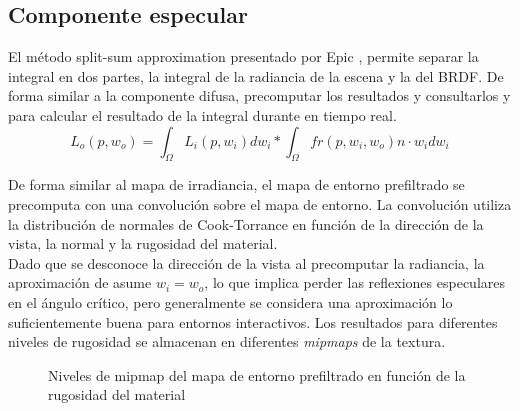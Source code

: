 
        \subsection{Componente especular}
        El m\'etodo split-sum approximation presentado por Epic \autocite{unreal}, permite separar la integral en dos partes, la integral de
        la radiancia de la escena y la del BRDF. De forma similar a la componente difusa, precomputar los resultados y consultarlos y para
        calcular el resultado de la integral durante en tiempo real.\\
        
        \singlespacing
        \begin{equation}
            L_o(p, w_o) =
            \int_{\Omega}L_i(p, w_i)dw_i * \int_{\Omega}fr(p, w_i, w_o) n\cdot{w_i}dw_i
        \end{equation}
        \singlespacing

        De forma similar al mapa de irradiancia, el mapa de entorno prefiltrado se precomputa con una convoluci\'on sobre el mapa
        de entorno. La convoluci\'on utiliza la distribuci\'on de normales de Cook-Torrance \autocite{cooktorrance} en funci\'on
        de la direcci\'on de la vista, la normal y la rugosidad del material.\\

        Dado que se desconoce la direcci\'on de la vista al precomputar la radiancia, la aproximaci\'on de asume $w_i = w_o$, lo que implica perder las
        reflexiones especulares en el \'angulo cr\'itico, pero generalmente se considera una aproximaci\'on lo suficientemente buena para entornos
        interactivos. Los resultados para diferentes niveles de rugosidad se almacenan en diferentes \textit{mipmaps} de la textura.\\

        
        \begin{figure}[H]
            \vspace{0.5cm}
            \centering
            \caption{Niveles de mipmap del mapa de entorno prefiltrado en funci\'on de la rugosidad del material}
        \end{figure}
        \singlespacing

